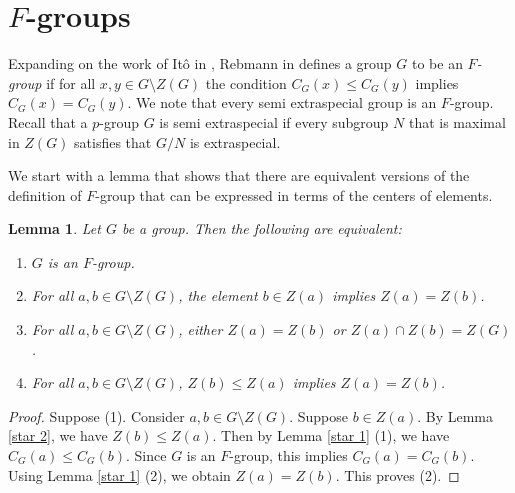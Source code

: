 \documentclass[12pt]{amsart}
\newtheorem{lemma}[theorem]{Lemma}
\begin{document}
{\section{$F$-groups}

Expanding on the work of It\^o in \cite{ito}, Rebmann in \cite{reb} defines a group $G$ to be an {\it $F$-group} if for all $x,y \in G \setminus Z(G)$ the condition $C_G(x) \le C_G (y)$ implies $C_G (x) = C_G (y)$.  We note that every semi extraspecial group is an $F$-group.  Recall that a $p$-group $G$ is semi extraspecial if every subgroup $N$ that is maximal in $Z(G)$ satisfies that $G/N$ is extraspecial.  %


We start with a lemma that shows that there are equivalent versions of the definition of $F$-group that can be expressed in terms of the centers of elements.

\begin{lemma} \label{part}
Let $G$ be a group.  Then the following are equivalent:
\begin{enumerate}
\item $G$ is an $F$-group.
\item For all $a,b \in G \setminus Z(G)$, the element $b \in Z (a)$ implies $Z (a) = Z (b)$.
\item For all $a,b \in G \setminus Z(G)$, either $Z(a) = Z(b)$ or $Z (a) \cap Z(b) = Z(G)$.
\item For all $a,b \in G \setminus Z(G)$, $Z (b) \le Z (a)$ implies $Z (a) = Z (b)$.
\end{enumerate}
\end{lemma}

\begin{proof}
Suppose (1).  Consider $a,b \in G \setminus Z(G)$.  Suppose $b \in Z(a)$.  By Lemma \ref{star 2}, we have $Z(b) \le Z(a)$.  Then by Lemma \ref{star 1} (1), we have $C_G (a) \le C_G (b)$.  Since $G$ is an $F$-group, this implies $C_G (a) = C_G (b)$.  Using Lemma \ref{star 1} (2), we obtain $Z (a) = Z (b)$.  This proves (2).
	

\end{proof}}
\end{document}

